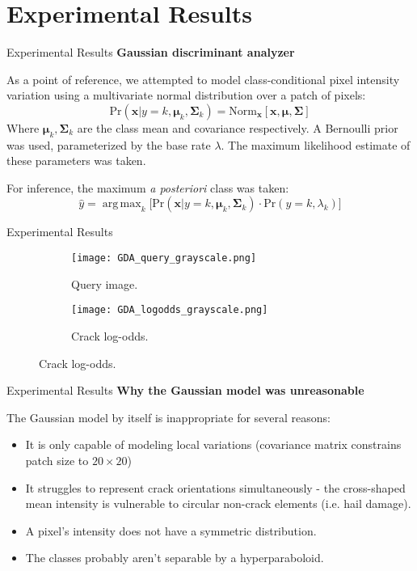 \documentclass[10pt]{beamer}
\DeclareMathOperator*{\argmax}{arg\,max}
\begin{document}
\section{Experimental Results}

\begin{frame}{Experimental Results}
	\textbf{Gaussian discriminant analyzer}
	
	As a point of reference, we attempted to model class-conditional pixel intensity variation using a multivariate normal distribution over a patch of pixels:
	\[
		\text{Pr}(\mathbf{x}|y = k, \boldsymbol{\mu}_k, \mathbf{\Sigma}_k) = \text{Norm}_{\mathbf{x}}[\mathbf{x}, \boldsymbol{\mu}, \mathbf{\Sigma}]
	\]
	Where $\boldsymbol{\mu}_k, \mathbf{\Sigma}_k$ are the class mean and covariance respectively. A Bernoulli prior was used, parameterized by the base rate $\lambda$. The maximum likelihood estimate of these parameters was taken.
	
	 For inference, the maximum \emph{a posteriori} class was taken:
	\[
		\hat{y} = \argmax_k \Big[\text{Pr}(\mathbf{x}|y = k, \boldsymbol{\mu}_k, \mathbf{\Sigma}_k) \cdot \text{Pr}(y = k, \lambda_k) \Big]
	\]
\end{frame}

\begin{frame}{Experimental Results}
	\begin{figure}
		\begin{subfigure}[b]{0.25\textwidth}
			\texttt{[image: GDA\_query\_grayscale.png]}
			\caption{Query image.}
		\end{subfigure}
		\qquad\qquad
		\begin{subfigure}[b]{0.25\textwidth}
			\texttt{[image: GDA\_logodds\_grayscale.png]}
			\caption{Crack log-odds.}
		\end{subfigure}
	
	\end{figure}
\end{frame}

\begin{frame}{Experimental Results}
	\textbf{Why the Gaussian model was unreasonable}
	
	The Gaussian model by itself is inappropriate for several reasons:
	\begin{itemize}
		\item It is only capable of modeling local variations (covariance matrix constrains patch size to $20 \times 20$)
		\item It struggles to represent crack orientations simultaneously - the cross-shaped mean intensity is vulnerable to circular non-crack elements (i.e. hail damage).
		\item A pixel's intensity does not have a symmetric distribution.
		\item The classes probably aren't separable by a hyperparaboloid.
	\end{itemize}
\end{frame}
\end{document}
